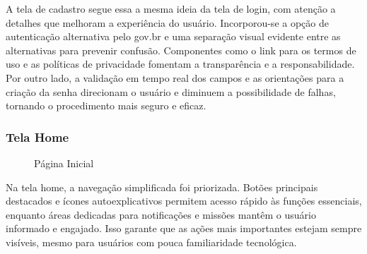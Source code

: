\documentclass[a4paper, 12pt]{article}
\begin{document}
A tela de cadastro segue essa a mesma ideia da tela de login, com atenção a detalhes que melhoram a experiência do usuário. Incorporou-se a opção de autenticação alternativa pelo gov.br e uma separação visual evidente entre as alternativas para prevenir confusão.  Componentes como o link para os termos de uso e as políticas de privacidade fomentam a transparência e a responsabilidade. Por outro lado, a validação em tempo real dos campos e as orientações para a criação da senha direcionam o usuário e diminuem a possibilidade de falhas, tornando o procedimento mais seguro e eficaz.

\subsubsection{Tela Home}

\begin{figure}[H]
  \centering
  \caption{Página Inicial}
  \label{fig:home}
\end{figure}

Na tela home, a navegação simplificada foi priorizada. Botões principais destacados e ícones autoexplicativos permitem acesso rápido às funções essenciais, enquanto áreas dedicadas para notificações e missões mantêm o usuário informado e engajado. Isso garante que as ações mais importantes estejam sempre visíveis, mesmo para usuários com pouca familiaridade tecnológica.
\end{document}
